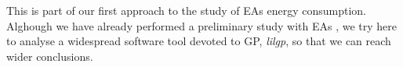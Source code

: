 This is part of our first approach to the study of EAs energy consumption.  Alghough we have already performed a preliminary study with EAs \cite{MAEB}, we try here to analyse a widespread software tool devoted to GP, \textit{lilgp}, so that we can reach wider conclusions.

